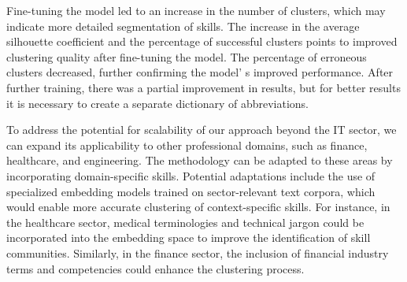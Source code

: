 
Fine-tuning the model led to an increase in the number of clusters,
which may indicate more detailed segmentation of skills. The increase in
the average silhouette coefficient and the percentage of successful
clusters points to improved clustering quality after fine-tuning the
model. The percentage of erroneous clusters decreased, further
confirming the model' s improved performance. After
further training, there was a partial improvement in results, but for
better results it is necessary to create a separate dictionary of
abbreviations.

To address the potential for scalability of our approach beyond the IT
sector, we can expand its applicability to other professional domains,
such as finance, healthcare, and engineering. The methodology can be
adapted to these areas by incorporating domain-specific skills.
Potential adaptations include the use of specialized embedding models
trained on sector-relevant text corpora, which would enable more
accurate clustering of context-specific skills. For instance, in the
healthcare sector, medical terminologies and technical jargon could be
incorporated into the embedding space to improve the identification of
skill communities. Similarly, in the finance sector, the inclusion of
financial industry terms and competencies could enhance the clustering
process.

